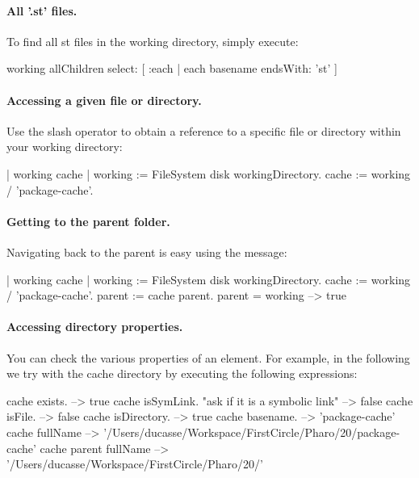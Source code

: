\documentclass[a4paper,10pt,twoside]{book}
\begin{document}
\paragraph{All '.st' files.}

To find all st files in the working directory, simply execute:

\begin{code}{}
working allChildren select: [ :each | each basename endsWith: 'st' ]
\end{code} 
 
 
\paragraph{Accessing a given file or directory.}
Use the slash operator to obtain a reference to a specific file or directory within your working directory:

\begin{code}{}
| working cache |
working := FileSystem disk workingDirectory.
cache := working / 'package-cache'.
\end{code} 

\paragraph{Getting to the parent folder.}
Navigating back to the parent is easy using the  message:

\begin{code}{}
| working cache |
working := FileSystem disk workingDirectory.
cache := working / 'package-cache'.
parent := cache parent.
parent = working			
--> true
\end{code}

\paragraph{Accessing directory properties.}

You can check the various properties of an element. For example, in the following we try with the cache directory by executing the following expressions:

\begin{code}{}
cache exists.														--> true
cache isSymLink. "ask if it is a symbolic link"		--> false
cache isFile.														--> false
cache isDirectory.												--> true
cache basename.						    					 --> 'package-cache'
cache fullName           
  --> '/Users/ducasse/Workspace/FirstCircle/Pharo/20/package-cache'
cache parent fullName    
  --> '/Users/ducasse/Workspace/FirstCircle/Pharo/20/'
\end{code}
 
\end{document}
